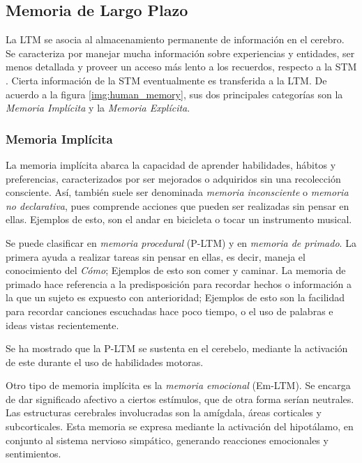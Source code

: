 \subsection{Memoria de Largo Plazo}

La LTM se asocia al almacenamiento permanente de información en el cerebro. Se caracteriza por manejar mucha información sobre experiencias y entidades, ser menos detallada y proveer un acceso más lento a los recuerdos, respecto a la STM \cite{Eichenbaum:2008}. Cierta información de la STM eventualmente es transferida a la LTM. De acuerdo a la figura \ref{img:human_memory}, sus dos principales categorías son la \textit{Memoria Implícita} y la \textit{Memoria Explícita}.

\subsubsection{Memoria Implícita}

La memoria implícita  abarca la capacidad de aprender habilidades, hábitos y preferencias, caracterizados por ser mejorados o adquiridos sin una recolección consciente. Así, también suele ser denominada \textit{memoria inconsciente} o \textit{memoria no declarativa}, pues comprende acciones que pueden ser realizadas sin pensar en ellas. Ejemplos de esto, son el andar en bicicleta o tocar un instrumento musical.

Se puede clasificar en \textit{memoria procedural} (P-LTM) y en \textit{memoria de primado}. La primera ayuda a realizar tareas sin pensar en ellas, es decir, maneja el conocimiento del \textit{Cómo}; Ejemplos de esto son comer y caminar. La memoria de primado hace referencia a la predisposición para recordar hechos o información a la que un sujeto es expuesto con anterioridad; Ejemplos de esto son la facilidad para recordar canciones escuchadas hace poco tiempo, o el uso de palabras e ideas vistas recientemente.

Se ha mostrado que la P-LTM se sustenta en el cerebelo, mediante la activación de este durante el uso de habilidades motoras.

Otro tipo de memoria implícita es la \textit{memoria emocional} (Em-LTM). Se encarga de dar significado afectivo a ciertos  estímulos, que de otra forma serían neutrales. Las estructuras cerebrales involucradas son la amígdala, áreas corticales y subcorticales. Esta memoria se expresa mediante la activación del hipotálamo, en conjunto al sistema nervioso simpático, generando reacciones emocionales y sentimientos.


